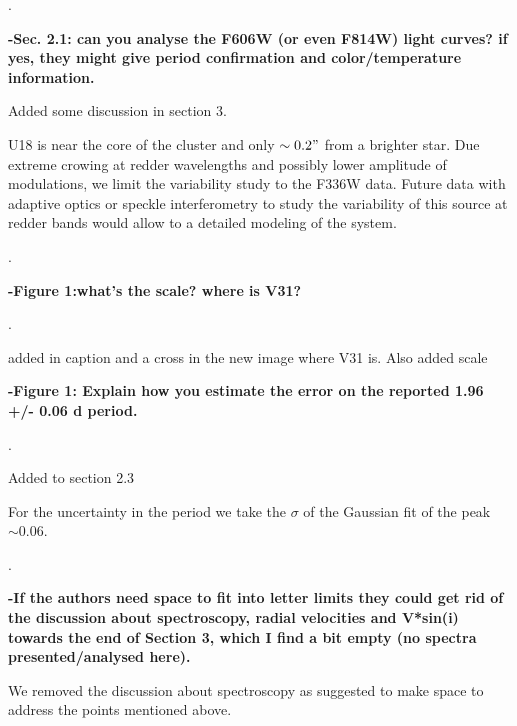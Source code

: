 \documentclass{article}
\begin{document}
 \hrulefill. 


\textbf{-Sec. 2.1: can you analyse the F606W (or even F814W) light curves? if yes, they might give period confirmation and color/temperature information.}

 \hrulefill
 

 Added some discussion in section 3. 
 
 \begin{displayquote}
U18 is near the core of the cluster and only $\sim 0.2"$ from a brighter star. Due extreme crowing at redder wavelengths and possibly lower amplitude of modulations, we limit the variability study to the F336W data. Future data with adaptive optics or speckle interferometry to study the variability of this source at redder bands would allow to a detailed modeling of the system. 

 \end{displayquote}
 


 \hrulefill. 



\textbf{-Figure 1:what's the scale? where is V31?} 

 \hrulefill. 


added in caption and a cross in the new image where V31 is. Also added scale \\


 \hrulefill

\textbf{-Figure 1: Explain how you estimate the error on the reported 1.96 +/- 0.06 d
period.}

 \hrulefill. 

Added to section 2.3

\begin{displayquote}
 For the uncertainty in the period we take the $\sigma$ of the Gaussian fit of the peak $\sim 0.06$. 
\end{displayquote}

 \hrulefill. 

\textbf{-If the authors need space to fit into letter
 limits they could get rid of the discussion about spectroscopy,
 radial velocities and V*sin(i) towards the end of Section 3, which I
 find a bit empty (no spectra presented/analysed here).}
 
 
 \hrulefill
 
 We removed the discussion about spectroscopy as suggested to make space to address the points mentioned above.  

\hrulefill


\end{document}
